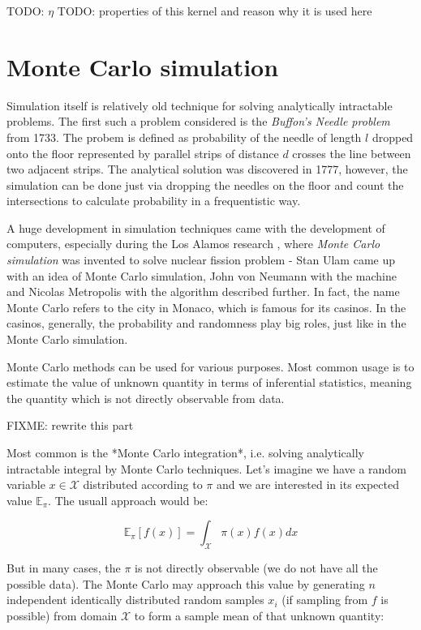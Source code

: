 \documentclass[
  digital, %
  table,   %
  twoside, %
  12pt,
  lof,     %
  lot,     %
]{fithesis3}
\begin{document}
TODO: $\eta$
TODO: properties of this kernel and reason why it is used here


\section{Monte Carlo simulation}

Simulation itself is relatively old technique for 
solving analytically intractable problems. 
The first such a problem considered is the 
\textit{Buffon's Needle problem} from 1733. 
The probem is defined as probability of the 
needle of length $l$ dropped onto the floor 
represented by parallel strips of distance 
$d$ crosses the line between two adjacent 
strips. 
The analytical solution was discovered in 1777, 
however, the simulation can be done just via 
dropping the needles on the floor and count 
the intersections to calculate probability 
in a frequentistic way.

A huge development in simulation techniques 
came with the development of computers, 
especially during the Los Alamos research 
\cite{metropolis1987}, where 
\textit{Monte Carlo simulation} was invented to 
solve nuclear fission problem - Stan Ulam 
came up with an idea of Monte Carlo simulation, 
John von Neumann with the machine and 
Nicolas Metropolis with the algorithm described 
further.
In fact, the name Monte Carlo refers to the city 
in Monaco, which is famous for its casinos. 
In the casinos, generally, the probability and 
randomness play big roles, just like in the 
Monte Carlo simulation.

Monte Carlo methods can be used for various 
purposes. 
Most common usage is to estimate the value of 
unknown quantity in terms of inferential 
statistics, meaning the quantity which is not 
directly observable from data.

FIXME: rewrite this part

Most common is the *Monte Carlo integration*, 
i.e. solving analytically intractable integral 
by Monte Carlo techniques. 
Let's imagine we have a random variable 
$x \in \mathcal{X}$ distributed according to 
$\pi$ and we are interested in its expected 
value $\mathbb{E}_{\pi}$. 
The usuall approach would be:

\begin{equation}
\mathbb{E}_{\pi}\left[ f(x) \right] = \int_{\mathcal{X}} \pi \left( x \right) f \left( x \right) dx
\end{equation}

But in many cases, the $\pi$ is not directly 
observable (we do not have all the possible data). 
The Monte Carlo may approach this value by 
generating $n$ independent identically distributed 
random samples $x_i$ (if sampling from $f$ is 
possible) from domain $\mathcal{X}$ to form a 
sample mean of that unknown quantity:
\end{document}
